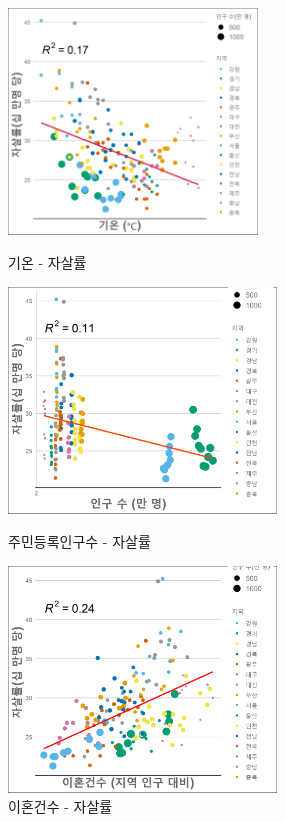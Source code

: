 \documentclass[a4paper, 11pt]{oblivoir}
\begin{document}
    \begin{figure}[!ht]
        \includegraphics[height = 6cm, width = \linewidth]{c11.png}
        \caption{기온 - 자살률}
        \label{fig:pic11}
        \endminipage\hfill
        \includegraphics[height = 6cm, width = \linewidth]{c14.png}
        \caption{주민등록인구수 - 자살률}
        \label{fig:pic12}
        \endminipage\hfill
        \includegraphics[height = 6cm, width = \linewidth]{c13.png}
        \caption{이혼건수 - 자살률}
        \label{fig:pic13}
        \endminipage\hfill
    
    \end{figure}
\end{document}
